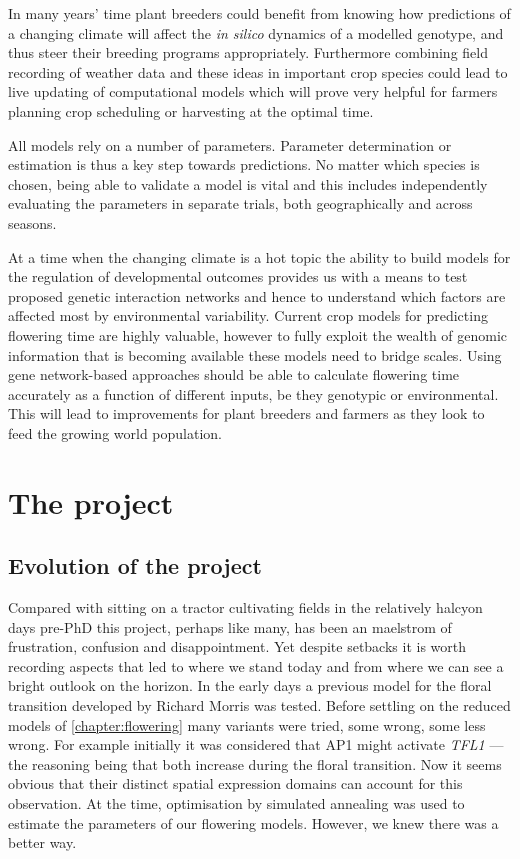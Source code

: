 In many years' time plant breeders could benefit from knowing how predictions of a changing climate will affect the \emph{in silico} dynamics of a modelled genotype, and thus steer their breeding programs appropriately.
Furthermore combining field recording of weather data and these ideas in important crop species could lead to live updating of computational models which will prove very helpful for farmers planning crop scheduling or harvesting at the optimal time.

All models rely on a number of parameters.
Parameter determination or estimation is thus a key step towards predictions.
No matter which species is chosen, being able to validate a model is vital and this includes independently evaluating the parameters in separate trials, both geographically and across seasons.

At a time when the changing climate is a hot topic the ability to build models for the regulation of developmental outcomes provides us with a means to test proposed genetic interaction networks and hence to understand which factors are affected most by environmental variability.
Current crop models for predicting flowering time are highly valuable, however to fully exploit the wealth of genomic information that is becoming available these models need to bridge scales.
Using gene network-based approaches should be able to calculate flowering time accurately as a function of different inputs, be they genotypic or environmental.
This will lead to improvements for plant breeders and farmers as they look to feed the growing world population.

\section{The project}

\subsection{Evolution of the project}

Compared with sitting on a tractor cultivating fields in the relatively halcyon days pre-PhD this project, perhaps like many, has been an maelstrom of frustration, confusion and disappointment.
Yet despite setbacks it is worth recording aspects that led to where we stand today and from where we can see a bright outlook on the horizon.
In the early days a previous model for the floral transition developed by Richard Morris was tested.
Before settling on the reduced models of \autoref{chapter:flowering} many variants were tried, some wrong, some less wrong.
For example initially it was considered that AP1 might activate \emph{TFL1} --- the reasoning being that both increase during the floral transition.
Now it seems obvious that their distinct spatial expression domains can account for this observation.
At the time, optimisation by simulated annealing was used to estimate the parameters of our flowering models.
However, we knew there was a better way.

